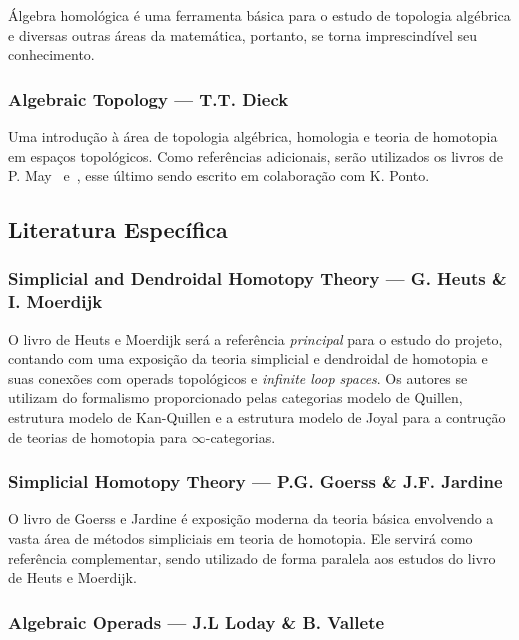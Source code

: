 \documentclass[11pt,reqno]{amsart}
\theoremstyle{definition}
\begin{document}
Álgebra homológica é uma ferramenta básica para o estudo de topologia algébrica
e diversas outras áreas da matemática, portanto, se torna imprescindível seu
conhecimento.

\subsubsection{%
  \textbf{Algebraic Topology} --- T.T. Dieck~\cite{Die08}
}%

Uma introdução à área de topologia algébrica, homologia e teoria de homotopia em
espaços topológicos. Como referências adicionais, serão utilizados os livros de
P. May~\cite{May99Concise} e~\cite{MayPonto12More}, esse último sendo escrito em
colaboração com K. Ponto.

\subsection{Literatura Específica}\label{sub:lit-esp}

\subsubsection{%
  \textbf{Simplicial and Dendroidal Homotopy Theory}
  --- G. Heuts \& I. Moerdijk~\cite{HeuMoer22}
}

O livro de Heuts e Moerdijk será a referência \emph{principal} para o estudo do
projeto, contando com uma exposição da teoria simplicial e dendroidal de
homotopia e suas conexões com operads topológicos e \textit{infinite loop
spaces}. Os autores se utilizam do formalismo proporcionado pelas categorias
modelo de Quillen, estrutura modelo de Kan-Quillen e a estrutura modelo de Joyal
para a contrução de teorias de homotopia para \(\infty\)-categorias.

\subsubsection{%
  \textbf{Simplicial Homotopy Theory}
  --- P.G. Goerss \& J.F. Jardine~\cite{GoeJar09}
}

O livro de Goerss e Jardine é exposição moderna da teoria básica envolvendo a
vasta área de métodos simpliciais em teoria de homotopia. Ele servirá como
referência complementar, sendo utilizado de forma paralela aos estudos do
livro de Heuts e Moerdijk.

\subsubsection{%
  \textbf{Algebraic Operads}
  --- J.L Loday \& B. Vallete~\cite{LodayVall12}
}
\end{document}
